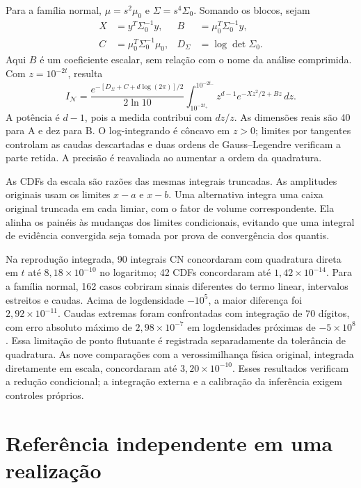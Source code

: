 Para a família normal, \(\mu=s^2\mu_0\) e
\(\Sigma=s^4\Sigma_0\). Somando os blocos, sejam
\begin{align}
 X&=y^T\Sigma_0^{-1}y,&
 B&=\mu_0^T\Sigma_0^{-1}y,\nonumber\\
 C&=\mu_0^T\Sigma_0^{-1}\mu_0,&
 D_\Sigma&=\log\det\Sigma_0.
 \label{eq:inf-coeficientes-normal}
\end{align}
Aqui \(B\) é um coeficiente escalar, sem relação com o nome da análise
comprimida. Com \(z=10^{-2t}\), resulta
\begin{equation}
 I_{\mathcal N}=
 \frac{e^{-[D_\Sigma+C+d\log(2\pi)]/2}}{2\ln10}
 \int_{10^{-2t_+}}^{10^{-2t_-}}
        z^{d-1}e^{-Xz^2/2+Bz}\,dz.
 \label{eq:inf-escala-normal}
\end{equation}
A potência é \(d-1\), pois a medida contribui com \(dz/z\).
As dimensões reais são 40 para A e dez para B. O log-integrando é
côncavo em \(z>0\); limites por tangentes controlam as caudas
descartadas e duas ordens de Gauss--Legendre verificam a parte retida.
A precisão é reavaliada ao aumentar a ordem da quadratura.

As CDFs da escala são razões das mesmas integrais truncadas.
As amplitudes originais usam os limites \(x-a\) e \(x-b\).
Uma alternativa integra uma caixa original truncada em cada limiar,
com o fator de volume correspondente. Ela alinha os painéis às mudanças
dos limites condicionais, evitando que uma integral de evidência
convergida seja tomada por prova de convergência dos quantis.

Na reprodução integrada, 90 integrais CN concordaram com quadratura
direta em \(t\) até \(8{,}18\times10^{-10}\) no logaritmo;
42 CDFs concordaram até \(1{,}42\times10^{-14}\).
Para a família normal, 162 casos cobriram sinais diferentes do termo
linear, intervalos estreitos e caudas. Acima de logdensidade
\(-10^5\), a maior diferença foi \(2{,}92\times10^{-11}\).
Caudas extremas foram confrontadas com integração de 70 dígitos,
com erro absoluto máximo de \(2{,}98\times10^{-7}\) em
logdensidades próximas de \(-5\times10^8\). Essa limitação de
ponto flutuante é registrada separadamente da tolerância de quadratura.
As nove comparações com a verossimilhança física original, integrada
diretamente em escala, concordaram até \(3{,}20\times10^{-10}\).
Esses resultados verificam a redução condicional; a integração externa
e a calibração da inferência exigem controles próprios.

\section{Referência independente em uma realização}

